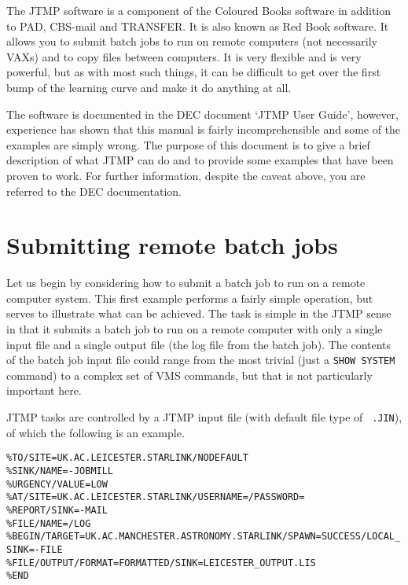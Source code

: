 The JTMP software is a component of the Coloured Books software in addition to
PAD, CBS-mail and TRANSFER. It is also  known as Red Book software. It allows
you to submit batch jobs to run on remote computers (not necessarily VAXs) and
to copy files between computers. It is very flexible and is very powerful, but
as with most such things, it can be difficult to get over the first bump of the
learning curve and make it do anything at all.

The software is documented in the DEC document `JTMP User Guide', however,
experience has shown that this manual is fairly incomprehensible and some of
the examples are simply wrong. The purpose of this document is to give a brief
description of what JTMP can do and to provide some examples that have been
proven to work. For further information, despite the caveat above, you are
referred to the DEC documentation.

\section{Submitting remote batch jobs}

Let us begin by considering how to submit a batch job to run on a remote
computer system. This first example performs a fairly simple operation, but
serves to illustrate what can be achieved. The task is simple in the JTMP sense
in that it submits a batch job to run on a remote computer with only a single
input file and a single output file (the log file from the batch job). The
contents of the batch job input file could range from the most trivial (just a
{\tt SHOW SYSTEM} command) to a complex set of VMS commands, but that is not
particularly important here. 

JTMP tasks are controlled by a JTMP input file (with default file type of {\tt
.JIN}), of which the following is an example.

\vspace{5mm}

\verb#%TO/SITE=UK.AC.LEICESTER.STARLINK/NODEFAULT                                         # \\
\verb#%SINK/NAME=-JOBMILL                                                                 # \\
\verb#%URGENCY/VALUE=LOW                                                                  # \\
\verb#%AT/SITE=UK.AC.LEICESTER.STARLINK/USERNAME=/PASSWORD=                               # \\
\verb#%REPORT/SINK=-MAIL                                                                  # \\
\verb#%FILE/NAME=/LOG                                                                     # \\
\verb#%BEGIN/TARGET=UK.AC.MANCHESTER.ASTRONOMY.STARLINK/SPAWN=SUCCESS/LOCAL_SINK=-FILE    # \\
\verb#%FILE/OUTPUT/FORMAT=FORMATTED/SINK=LEICESTER_OUTPUT.LIS                             # \\
\verb#%END                                                                                # \\

